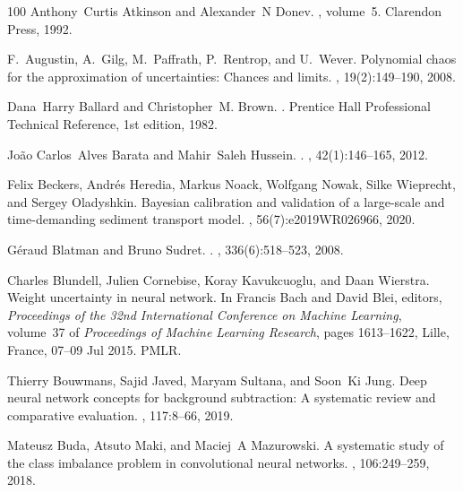 \documentclass[a4paper,fleqn]{article}
\begin{document}
\begin{thebibliography}{100}
Anthony~Curtis Atkinson and Alexander~N Donev.
, volume~5.
\newblock Clarendon Press, 1992.

F.~Augustin, A.~Gilg, M.~Paffrath, P.~Rentrop, and U.~Wever.
\newblock Polynomial chaos for the approximation of uncertainties: Chances and
  limits.
, 19(2):149–190, 2008.

Dana~Harry Ballard and Christopher~M. Brown.
.
\newblock Prentice Hall Professional Technical Reference, 1st edition, 1982.

Jo{\~a}o Carlos~Alves Barata and Mahir~Saleh Hussein.
.
, 42(1):146--165, 2012.

Felix Beckers, Andr{\'e}s Heredia, Markus Noack, Wolfgang Nowak, Silke
  Wieprecht, and Sergey Oladyshkin.
\newblock Bayesian calibration and validation of a large-scale and
  time-demanding sediment transport model.
, 56(7):e2019WR026966, 2020.

G{\'e}raud Blatman and Bruno Sudret.
.
, 336(6):518--523, 2008.

Charles Blundell, Julien Cornebise, Koray Kavukcuoglu, and Daan Wierstra.
\newblock Weight uncertainty in neural network.
\newblock In Francis Bach and David Blei, editors, {\em Proceedings of the 32nd
  International Conference on Machine Learning}, volume~37 of {\em Proceedings
  of Machine Learning Research}, pages 1613--1622, Lille, France, 07--09 Jul
  2015. PMLR.

Thierry Bouwmans, Sajid Javed, Maryam Sultana, and Soon~Ki Jung.
\newblock Deep neural network concepts for background subtraction: A systematic
  review and comparative evaluation.
, 117:8--66, 2019.

Mateusz Buda, Atsuto Maki, and Maciej~A Mazurowski.
\newblock A systematic study of the class imbalance problem in convolutional
  neural networks.
, 106:249--259, 2018.


\end{thebibliography}
\end{document}
